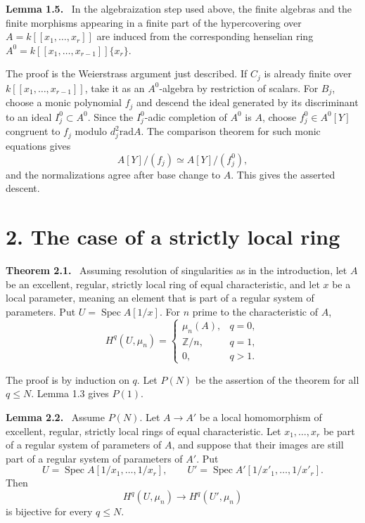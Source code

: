 \documentclass[12pt]{article}
\newcommand{\ZZ}{\mathbb Z}
\DeclareMathOperator{\Spec}{Spec}
\newcommand{\rad}{\mathrm{rad}}
\newenvironment{statement}[1]{\par\medskip\noindent\textbf{#1.}\ }{\par\medskip}
\begin{document}
\begin{statement}{Lemma 1.5}
In the algebraization step used above, the finite algebras and the finite morphisms appearing in a finite part of the hypercovering over $A=k[[x_1,\ldots,x_r]]$ are induced from the corresponding henselian ring $A^0=k[[x_1,\ldots,x_{r-1}]]\{x_r\}$.
\end{statement}

The proof is the Weierstrass argument just described. If $C_j$ is already finite over $k[[x_1,\ldots,x_{r-1}]]$, take it as an $A^0$-algebra by restriction of scalars. For $B_j$, choose a monic polynomial $f_j$ and descend the ideal generated by its discriminant to an ideal $I_j^0\subset A^0$. Since the $I_j^0$-adic completion of $A^0$ is $A$, choose $f_j^0\in A^0[Y]$ congruent to $f_j$ modulo $d_j^2\rad A$. The comparison theorem for such monic equations gives
\[
   A[Y]/(f_j)\simeq A[Y]/(f_j^0),
\]
and the normalizations agree after base change to $A$. This gives the asserted descent.

\section*{2. The case of a strictly local ring}

\begin{statement}{Theorem 2.1}
Assuming resolution of singularities as in the introduction, let $A$ be an excellent, regular, strictly local ring of equal characteristic, and let $x$ be a local parameter, meaning an element that is part of a regular system of parameters. Put $U=\Spec A[1/x]$. For $n$ prime to the characteristic of $A$,
\[
H^q(U,\mu_n)=
\begin{cases}
\mu_n(A),&q=0,\\
\ZZ/n,&q=1,\\
0,&q>1.
\end{cases}
\]
\end{statement}

The proof is by induction on $q$. Let $P(N)$ be the assertion of the theorem for all $q\leq N$. Lemma 1.3 gives $P(1)$.

\begin{statement}{Lemma 2.2}
Assume $P(N)$. Let $A\to A'$ be a local homomorphism of excellent, regular, strictly local rings of equal characteristic. Let $x_1,\ldots,x_r$ be part of a regular system of parameters of $A$, and suppose that their images are still part of a regular system of parameters of $A'$. Put
\[
   U=\Spec A[1/x_1,\ldots,1/x_r],\qquad
   U'=\Spec A'[1/x'_1,\ldots,1/x'_r].
\]
Then
\[
   H^q(U,\mu_n)\longrightarrow H^q(U',\mu_n)
\]
is bijective for every $q\leq N$.
\end{statement}
\end{document}
